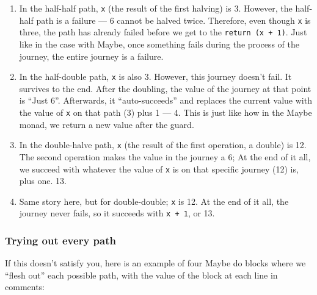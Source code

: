 \documentclass[]{article}
\begin{document}
\begin{enumerate}
\def\labelenumi{\arabic{enumi}.}
\tightlist
\item
  In the half-half path, \texttt{x} (the result of the first halving) is 3.
  However, the half-half path is a failure --- 6 cannot be halved twice.
  Therefore, even though \texttt{x} is three, the path has already failed before
  we get to the \texttt{return\ (x\ +\ 1)}. Just like in the case with Maybe,
  once something fails during the process of the journey, the entire journey is
  a failure.
\item
  In the half-double path, \texttt{x} is also 3. However, this journey doesn't
  fail. It survives to the end. After the doubling, the value of the journey at
  that point is ``Just 6''. Afterwards, it ``auto-succeeds'' and replaces the
  current value with the value of \texttt{x} on that path (3) plus 1 --- 4. This
  is just like how in the Maybe monad, we return a new value after the guard.
\item
  In the double-halve path, \texttt{x} (the result of the first operation, a
  double) is 12. The second operation makes the value in the journey a 6; At the
  end of it all, we succeed with whatever the value of \texttt{x} is on that
  specific journey (12) is, plus one. 13.
\item
  Same story here, but for double-double; \texttt{x} is 12. At the end of it
  all, the journey never fails, so it succeeds with \texttt{x\ +\ 1}, or 13.
\end{enumerate}

\subsubsection{Trying out every path}\label{trying-out-every-path}

If this doesn't satisfy you, here is an example of four Maybe do blocks where we
``flesh out'' each possible path, with the value of the block at each line in
comments:
\end{document}
